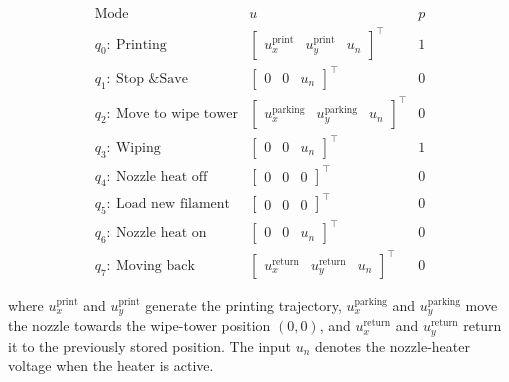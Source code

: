 \documentclass[11pt,a4paper]{article}
\begin{document}
\[
\begin{array}{c|c|c}
\text{Mode} & u & p \\ \hline

q_0:\ \text{Printing}
&
\begin{bmatrix}
u_x^{\mathrm{print}} &
u_y^{\mathrm{print}} &
u_n
\end{bmatrix}^{\top}
& 1
\\[3mm]

q_1:\ \text{Stop \& Save}
&
\begin{bmatrix}
0 & 0 & u_n
\end{bmatrix}^{\top}
& 0
\\[3mm]

q_2:\ \text{Move to wipe tower}
&
\begin{bmatrix}
u_x^{\mathrm{parking}} &
u_y^{\mathrm{parking}} &
u_n
\end{bmatrix}^{\top}
& 0
\\[3mm]

q_3:\ \text{Wiping}
&
\begin{bmatrix}
0 & 0 & u_n
\end{bmatrix}^{\top}
& 1
\\[3mm]

q_4:\ \text{Nozzle heat off}
&
\begin{bmatrix}
0 & 0 & 0
\end{bmatrix}^{\top}
& 0
\\[3mm]

q_5:\ \text{Load new filament}
&
\begin{bmatrix}
0 & 0 & 0
\end{bmatrix}^{\top}
& 0
\\[3mm]

q_6:\ \text{Nozzle heat on}
&
\begin{bmatrix}
0 & 0 & u_n
\end{bmatrix}^{\top}
& 0
\\[3mm]

q_7:\ \text{Moving back}
&
\begin{bmatrix}
u_x^{\mathrm{return}} &
u_y^{\mathrm{return}} &
u_n
\end{bmatrix}^{\top}
& 0
\end{array}
\]

where \(u_x^{\mathrm{print}}\) and \(u_y^{\mathrm{print}}\) generate the printing trajectory,
\(u_x^{\mathrm{parking}}\) and \(u_y^{\mathrm{parking}}\) move the nozzle towards the wipe-tower position
\((0,0)\), and \(u_x^{\mathrm{return}}\) and \(u_y^{\mathrm{return}}\) return it to the previously stored position.
The input \(u_n\) denotes the nozzle-heater voltage when the heater is active.
\end{document}
